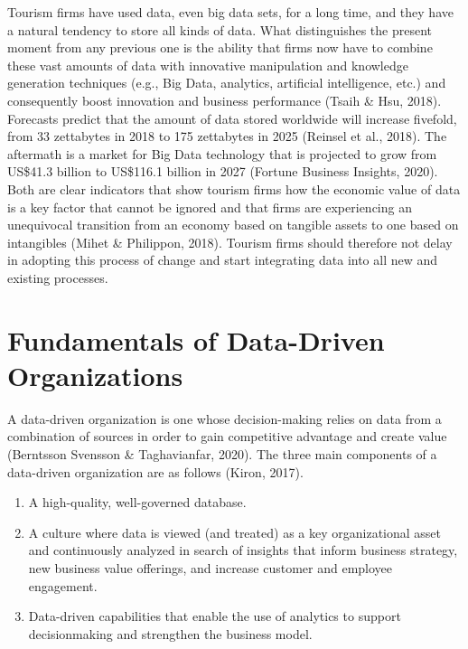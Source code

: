 \documentclass[
  letterpaper,
  DIV=11,
  numbers=noendperiod]{scrreprt}
\begin{document}
Tourism firms have used data, even big data sets, for a long time, and
they have a natural tendency to store all kinds of data. What
distinguishes the present moment from any previous one is the ability
that firms now have to combine these vast amounts of data with
innovative manipulation and knowledge generation techniques (e.g., Big
Data, analytics, artificial intelligence, etc.) and consequently boost
innovation and business performance (Tsaih \& Hsu, 2018). Forecasts
predict that the amount of data stored worldwide will increase fivefold,
from 33 zettabytes in 2018 to 175 zettabytes in 2025 (Reinsel et al.,
2018). The aftermath is a market for Big Data technology that is
projected to grow from US\$41.3 billion to US\$116.1 billion in 2027
(Fortune Business Insights, 2020). Both are clear indicators that show
tourism firms how the economic value of data is a key factor that cannot
be ignored and that firms are experiencing an unequivocal transition
from an economy based on tangible assets to one based on intangibles
(Mihet \& Philippon, 2018). Tourism firms should therefore not delay in
adopting this process of change and start integrating data into all new
and existing processes.

\hypertarget{fundamentals-of-data-driven-organizations}{%
\section{Fundamentals of Data-Driven
Organizations}\label{fundamentals-of-data-driven-organizations}}

A data-driven organization is one whose decision-making relies on data
from a combination of sources in order to gain competitive advantage and
create value (Berntsson Svensson \& Taghavianfar, 2020). The three main
components of a data-driven organization are as follows (Kiron, 2017).

\begin{enumerate}
\def\labelenumi{\arabic{enumi}.}
\item
  A high-quality, well-governed database.
\item
  A culture where data is viewed (and treated) as a key organizational
  asset and continuously analyzed in search of insights that inform
  business strategy, new business value offerings, and increase customer
  and employee engagement.
\item
  Data-driven capabilities that enable the use of analytics to support
  decisionmaking and strengthen the business model.
\end{enumerate}
\end{document}

